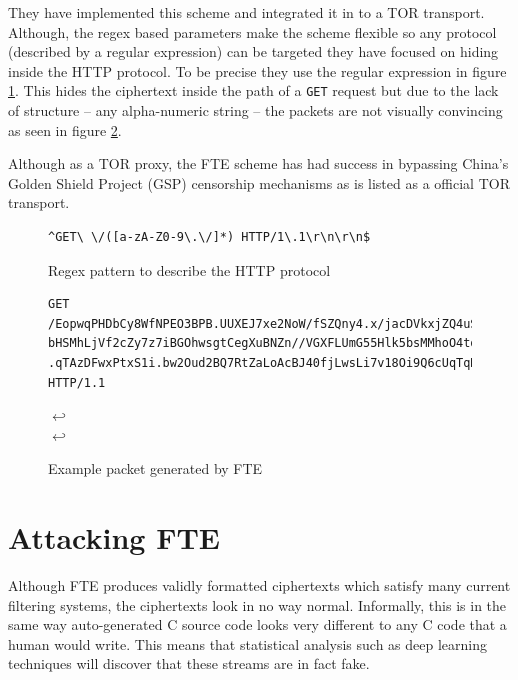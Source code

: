 \documentclass[ %
                    author={Samuel Russell},
                supervisor={Prof. Bogdan Warinschi},
                    degree={MEng},
                     title={Innocuous Ciphertexts},
                  subtitle={The DE-CENSOR Scheme},
                      type={Research},
                      year={2018} ]{dissertation}
\begin{document}
They have implemented this scheme and integrated it in to a TOR transport. Although, the regex based parameters make the scheme flexible so any protocol (described by a regular expression) can be targeted they have focused on hiding inside the HTTP protocol. To be precise they use the regular expression in figure \ref{fig:http-regex}. This hides the ciphertext inside the path of a \texttt{GET} request but due to the lack of structure -- any alpha-numeric string -- the packets are not visually convincing as seen in figure \ref{fig:http-ex}.

Although as a TOR proxy, the FTE scheme has had success in bypassing China's Golden Shield Project (GSP) censorship mechanisms as is listed as a official TOR transport.

\begin{figure}[h]
\begin{verbatim}
^GET\ \/([a-zA-Z0-9\.\/]*) HTTP/1\.1\r\n\r\n$
\end{verbatim}
\caption{Regex pattern to describe the HTTP protocol}
\label{fig:http-regex}
\end{figure}


\begin{figure}[h]
\begin{verbatim}
GET /EopwqPHDbCy8WfNPEO3BPB.UUXEJ7xe2NoW/fSZQny4.x/jacDVkxjZQ4uSqgZu7.N2AGbaYeFqr/DEh
bHSMhLjVf2cZy7z7iBGOhwsgtCegXuBNZn//VGXFLUmG55Hlk5bsMMhoO4tqF.mYApGxAd2c0G/goOnZLivQB
.qTAzDFwxPtxS1i.bw2Oud2BQ7RtZaLoAcBJ40fjLwsLi7v18Oi9Q6cUqTqHKTMsVWijB9/kh HTTP/1.1
\end{verbatim}
$\hookleftarrow$\\
$\hookleftarrow$
\caption{Example packet generated by FTE}
\label{fig:http-ex}
\end{figure}




\section{Attacking FTE}\label{attacking_fte}

Although FTE produces validly formatted ciphertexts which satisfy many current filtering systems, the ciphertexts look in no way normal.
Informally, this is in the same way auto-generated C source code looks very different to any C code that a human would write.
This means that statistical analysis such as deep learning techniques will discover that these streams are in fact fake.
\end{document}
